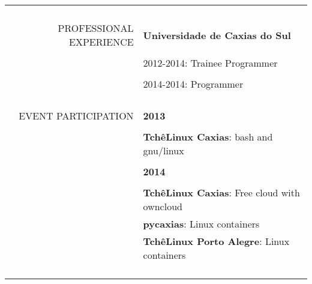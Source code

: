 \begin{tabular}{rp{13cm}}
    \\\\\\
    \hline
    \\\\
    \uppercase{Professional experience}
    & \textbf{Universidade de Caxias do Sul} \\\\
    & 2012-2014: Trainee Programmer \\\\
    & 2014-2014: Programmer
    \\\\\\
    \hline
    \\\\
    \uppercase{Event participation}
    & \textbf{2013} \\\\
    & \textbf{TchêLinux Caxias}: bash and gnu/linux \\\\
    & \textbf{2014} \\\\
    & \textbf{TchêLinux Caxias}: Free cloud with owncloud \\
    & \textbf{pycaxias}: Linux containers \\
    & \textbf{TchêLinux Porto Alegre}: Linux containers
    \\\\\\
    \hline
    \\\\
\end{tabular}
